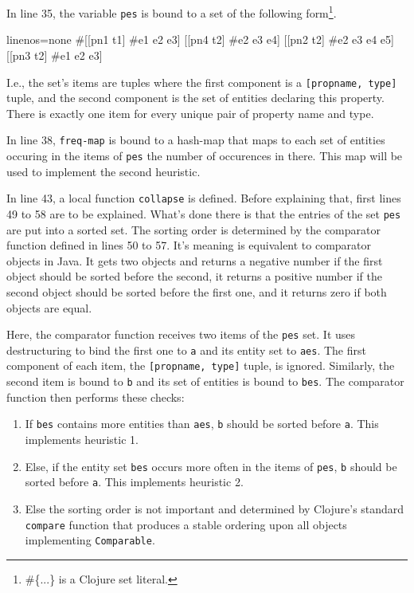 \documentclass[11pt]{article}
\begin{document}
In line 35, the variable \verb|pes| is bound to a set of the following
form\footnote{\textsf{\#\{...\} is a Clojure set literal.}}.

\begin{clojurecode*}{linenos=none}
#{[[pn1 t1] #{e1 e2 e3}]
  [[pn4 t2] #{e2 e3 e4}]
  [[pn2 t2] #{e2 e3 e4 e5}]
  [[pn3 t2] #{e1 e2 e3}]}
\end{clojurecode*}

I.e., the set's items are tuples where the first component is a
\verb|[propname, type]| tuple, and the second component is the set of entities
declaring this property.  There is exactly one item for every unique pair of
property name and type.

In line 38, \verb|freq-map| is bound to a hash-map that maps to each set of
entities occuring in the items of \verb|pes| the number of occurences in there.
This map will be used to implement the second heuristic.

In line 43, a local function \verb|collapse| is defined.  Before explaining
that, first lines 49 to 58 are to be explained.  What's done there is that the
entries of the set \verb|pes| are put into a sorted set.  The sorting order is
determined by the comparator function defined in lines 50 to 57.  It's meaning
is equivalent to comparator objects in Java.  It gets two objects and returns a
negative number if the first object should be sorted before the second, it
returns a positive number if the second object should be sorted before the
first one, and it returns zero if both objects are equal.

Here, the comparator function receives two items of the \verb|pes| set.  It
uses destructuring to bind the first one to \verb|a| and its entity set to
\verb|aes|.  The first component of each item, the \verb|[propname, type]|
tuple, is ignored.  Similarly, the second item is bound to \verb|b| and its set
of entities is bound to \verb|bes|.  The comparator function then performs
these checks:

\begin{enumerate}
\item If \verb|bes| contains more entities than \verb|aes|, \verb|b| should be
  sorted before \verb|a|.  This implements heuristic 1.
\item Else, if the entity set \verb|bes| occurs more often in the items of
  \verb|pes|, \verb|b| should be sorted before \verb|a|.  This implements
  heuristic 2.
\item Else the sorting order is not important and determined by Clojure's
  standard \verb|compare| function that produces a stable ordering upon all
  objects implementing \verb|Comparable|.
\end{enumerate}
\end{document}
